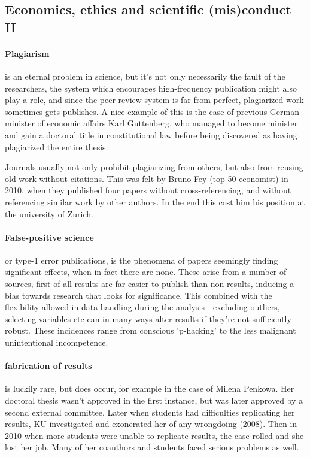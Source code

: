 \documentclass[12pt, a4paper]{article}
\begin{document}
\begin{multicols}{2}
\subsection{Economics, ethics and scientific (mis)conduct II}
\paragraph{Plagiarism} is an eternal problem in science, but it's not only necessarily the fault of the researchers, the system which encourages high-frequency publication might also play a role, and since the peer-review system is far from perfect, plagiarized work sometimes gets publishes. A nice example of this is the case of previous German minister of economic affairs  Karl Guttenberg, who managed to become minister and gain a doctoral title in constitutional law before being discovered as having plagiarized the entire thesis. 

Journals usually not only prohibit plagiarizing from others, but also from reusing old work without citations. This was felt by Bruno Fey (top 50 economist) in 2010, when they published four papers without cross-referencing, and without referencing similar work by other authors. In the end this cost him his position at the university of Zurich. 


\paragraph{False-positive science} or type-1 error publications, is the phenomena of papers seemingly finding significant effects, when in fact there are none. These arise from a number of sources, first of all results are far easier to publish than non-results, inducing a bias towards research that looks for significance. This combined with the flexibility allowed in data handling during the analysis - excluding outliers, selecting variables etc can in many ways alter results if they're not sufficiently robust. These incidences range from conscious 'p-hacking' to the less malignant unintentional incompetence. 

\paragraph{fabrication of results} is luckily rare, but does occur, for example in the case of Milena Penkowa. Her doctoral thesis wasn't approved in the first instance, but was later approved by a second external committee. Later when students had difficulties replicating her results, KU investigated and exonerated her of any wrongdoing (2008). Then in 2010 when more students were unable to replicate results, the case rolled and she lost her job. Many of her coauthors and students faced serious problems as well. 


\end{multicols}
\end{document}
